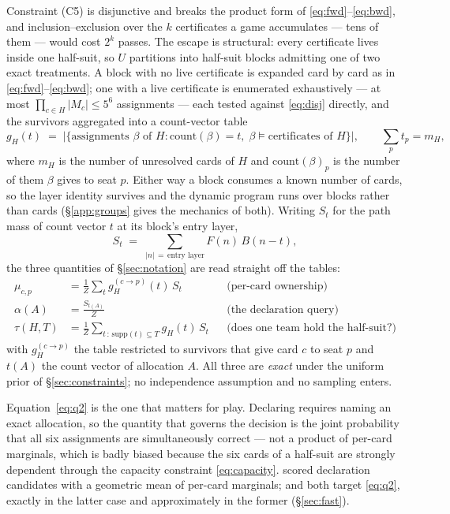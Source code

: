 Constraint (C5) is disjunctive and breaks the product form of
\eqref{eq:fwd}--\eqref{eq:bwd}, and inclusion--exclusion over the $k$
certificates a game accumulates --- tens of them --- would cost $2^k$ passes. The
escape is structural: every certificate lives inside one half-suit, so $U$
partitions into half-suit blocks admitting one of two exact treatments. A block with no live
certificate is expanded card by card as in \eqref{eq:fwd}--\eqref{eq:bwd}; one
with a live certificate is enumerated exhaustively --- at most
$\prod_{c \in H}|M_c| \le 5^6$ assignments --- each tested against
\eqref{eq:disj} directly, and the survivors aggregated into a count-vector
table
\begin{equation}
  g_H(t) \;=\; \bigl|\{\text{assignments } \beta \text{ of } H :
    \mathrm{count}(\beta) = t,\; \beta \models \text{certificates of } H\}\bigr|,
  \qquad \textstyle\sum_p t_p = m_H ,
  \label{eq:blocktable}
\end{equation}
where $m_H$ is the number of unresolved cards of $H$ and
$\mathrm{count}(\beta)_p$ is the number of them $\beta$ gives to seat $p$. Either
way a block consumes a known number of cards, so the layer identity survives and
the dynamic program runs over blocks rather than cards (\S\ref{app:groups} gives
the mechanics of both). Writing $S_t$ for the path mass of count vector $t$ at
its block's entry layer,
\begin{equation}
  S_t \;=\; \sum_{|n| \,=\, \text{entry layer}} F(n)\, B(n - t),
  \label{eq:pathmass}
\end{equation}
the three quantities of \S\ref{sec:notation} are read straight off the tables:
\begin{align}
  \mu_{c,p} &= \frac{1}{Z}\sum_t g_H^{(c \to p)}(t)\, S_t
  &&\text{(per-card ownership)} \label{eq:q1}\\
  \alpha(A) &= \frac{S_{t(A)}}{Z}
  &&\text{(the declaration query)} \label{eq:q2}\\
  \tau(H,T) &= \frac{1}{Z}\sum_{t \,:\, \mathrm{supp}(t) \subseteq T} g_H(t)\, S_t
  &&\text{(does one team hold the half-suit?)} \label{eq:q3}
\end{align}
with $g_H^{(c \to p)}$ the table restricted to survivors that give card $c$ to
seat $p$ and $t(A)$ the count vector of allocation $A$. All three are
\emph{exact} under the uniform prior of \S\ref{sec:constraints}; no
independence assumption and no sampling enters.

Equation~\eqref{eq:q2} is the one that matters for play. Declaring requires
naming an exact allocation, so the quantity that governs the decision is the
joint probability that all six assignments are simultaneously correct --- not
a product of per-card marginals, which is badly biased because the six cards
of a half-suit are strongly dependent through the capacity constraint
\eqref{eq:capacity}. \vthree{} scored declaration candidates with a geometric
mean of per-card marginals; \vfast{} and \vblock{} both target \eqref{eq:q2},
exactly in the latter case and approximately in the former (\S\ref{sec:fast}).

